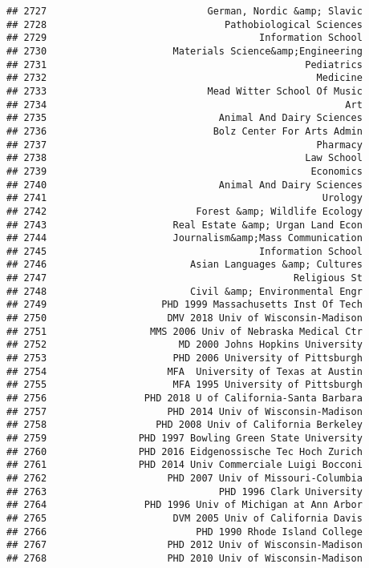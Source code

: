 \documentclass[
]{article}
\begin{document}
\begin{verbatim}
## 2727                            German, Nordic &amp; Slavic
## 2728                               Pathobiological Sciences
## 2729                                     Information School
## 2730                      Materials Science&amp;Engineering
## 2731                                             Pediatrics
## 2732                                               Medicine
## 2733                            Mead Witter School Of Music
## 2734                                                    Art
## 2735                              Animal And Dairy Sciences
## 2736                             Bolz Center For Arts Admin
## 2737                                               Pharmacy
## 2738                                             Law School
## 2739                                              Economics
## 2740                              Animal And Dairy Sciences
## 2741                                                Urology
## 2742                          Forest &amp; Wildlife Ecology
## 2743                      Real Estate &amp; Urgan Land Econ
## 2744                      Journalism&amp;Mass Communication
## 2745                                     Information School
## 2746                         Asian Languages &amp; Cultures
## 2747                                           Religious St
## 2748                         Civil &amp; Environmental Engr
## 2749                    PHD 1999 Massachusetts Inst Of Tech
## 2750                     DMV 2018 Univ of Wisconsin-Madison
## 2751                  MMS 2006 Univ of Nebraska Medical Ctr
## 2752                       MD 2000 Johns Hopkins University
## 2753                      PHD 2006 University of Pittsburgh
## 2754                     MFA  University of Texas at Austin
## 2755                      MFA 1995 University of Pittsburgh
## 2756                 PHD 2018 U of California-Santa Barbara
## 2757                     PHD 2014 Univ of Wisconsin-Madison
## 2758                   PHD 2008 Univ of California Berkeley
## 2759                PHD 1997 Bowling Green State University
## 2760                PHD 2016 Eidgenossische Tec Hoch Zurich
## 2761                PHD 2014 Univ Commerciale Luigi Bocconi
## 2762                     PHD 2007 Univ of Missouri-Columbia
## 2763                              PHD 1996 Clark University
## 2764                 PHD 1996 Univ of Michigan at Ann Arbor
## 2765                      DVM 2005 Univ of California Davis
## 2766                          PHD 1990 Rhode Island College
## 2767                     PHD 2012 Univ of Wisconsin-Madison
## 2768                     PHD 2010 Univ of Wisconsin-Madison

\end{verbatim}
\end{document}
